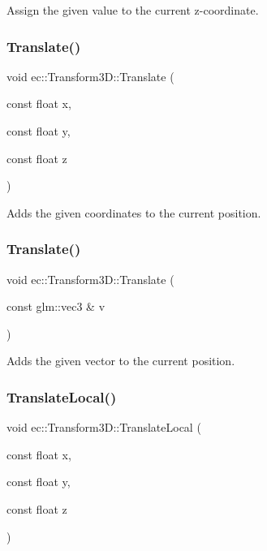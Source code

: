 Assign the given value to the current z-\/coordinate. \mbox{\label{classec_1_1_transform3_d_a553b6e61a45aae2661bcb5568613a32a}} 
\subsubsection{\texorpdfstring{Translate()}{Translate()}\hspace{0.1cm}{\footnotesize\ttfamily [1/2]}}
{\footnotesize\ttfamily void ec\+::\+Transform3\+D\+::\+Translate (\begin{DoxyParamCaption}\item[{const float}]{x,  }\item[{const float}]{y,  }\item[{const float}]{z }\end{DoxyParamCaption})}

Adds the given coordinates to the current position. \mbox{\label{classec_1_1_transform3_d_a9935de1ebeecdd4bfd58073c1ea1b854}} 
\subsubsection{\texorpdfstring{Translate()}{Translate()}\hspace{0.1cm}{\footnotesize\ttfamily [2/2]}}
{\footnotesize\ttfamily void ec\+::\+Transform3\+D\+::\+Translate (\begin{DoxyParamCaption}\item[{const glm\+::vec3 \&}]{v }\end{DoxyParamCaption})}

Adds the given vector to the current position. \mbox{\label{classec_1_1_transform3_d_a84df51411133b3402b75fa05bd51faae}} 
\subsubsection{\texorpdfstring{Translate\+Local()}{TranslateLocal()}\hspace{0.1cm}{\footnotesize\ttfamily [1/2]}}
{\footnotesize\ttfamily void ec\+::\+Transform3\+D\+::\+Translate\+Local (\begin{DoxyParamCaption}\item[{const float}]{x,  }\item[{const float}]{y,  }\item[{const float}]{z }\end{DoxyParamCaption})}

